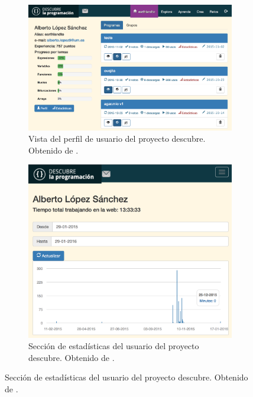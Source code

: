 \begin{figure}[!ht]
	\begin{adjustwidth}{\oddsidemargin-1in}{\rightmargin}
			\begin{subfigure}{\paperwidth}
				\centering
				\includegraphics[scale=.35]{images/descubre-profile.png}
				\caption{Vista del perfil de usuario del proyecto \Gls{descubre}. Obtenido de \cite{descubre}.}
				\label{fig:descubre-perfil}
			\end{subfigure}
			\begin{subfigure}{\paperwidth}
				\centering
				\includegraphics[scale=.35]{images/descubre-statistics.png}
				\caption{Sección de estadísticas del usuario del proyecto \Gls{descubre}. Obtenido de \cite{descubre}.}
				\label{fig:descubre-estadisticas}
			\end{subfigure}
		\label{fig:decubre-perfil-estadisticas}
	\end{adjustwidth}
\end{figure}


